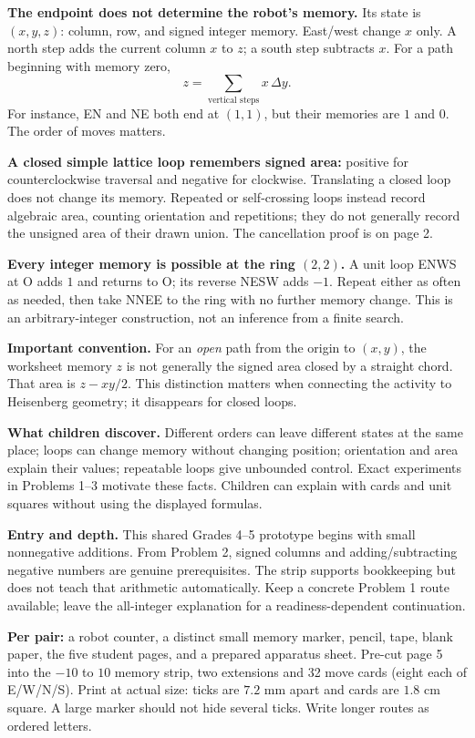 \documentclass[11pt,letterpaper]{article}
\newcommand{\sectiontitle}[1]{\par\vspace{4pt}{\large\bfseries #1}\par}
\begin{document}
\sectiontitle{The mathematics first}
\textbf{The endpoint does not determine the robot's memory.} Its state is $(x,y,z)$: column, row, and signed integer memory. East/west change $x$ only. A north step adds the current column $x$ to $z$; a south step subtracts $x$. For a path beginning with memory zero,
\[
 z=\sum_{\text{vertical steps}}x\,\Delta y.
\]
For instance, EN and NE both end at $(1,1)$, but their memories are $1$ and $0$. The order of moves matters.

\textbf{A closed simple lattice loop remembers signed area:} positive for counterclockwise traversal and negative for clockwise. Translating a closed loop does not change its memory. Repeated or self-crossing loops instead record algebraic area, counting orientation and repetitions; they do not generally record the unsigned area of their drawn union. The cancellation proof is on page 2.

\textbf{Every integer memory is possible at the ring $(2,2)$.} A unit loop ENWS at O adds $1$ and returns to O; its reverse NESW adds $-1$. Repeat either as often as needed, then take NNEE to the ring with no further memory change. This is an arbitrary-integer construction, not an inference from a finite search.

\textbf{Important convention.} For an \emph{open} path from the origin to $(x,y)$, the worksheet memory $z$ is not generally the signed area closed by a straight chord. That area is $z-xy/2$. This distinction matters when connecting the activity to Heisenberg geometry; it disappears for closed loops.

\textbf{What children discover.} Different orders can leave different states at the same place; loops can change memory without changing position; orientation and area explain their values; repeatable loops give unbounded control. Exact experiments in Problems 1--3 motivate these facts. Children can explain with cards and unit squares without using the displayed formulas.

\textbf{Entry and depth.} This shared Grades 4--5 prototype begins with small nonnegative additions. From Problem 2, signed columns and adding/subtracting negative numbers are genuine prerequisites. The strip supports bookkeeping but does not teach that arithmetic automatically. Keep a concrete Problem 1 route available; leave the all-integer explanation for a readiness-dependent continuation.

\sectiontitle{Prepare and launch}
\textbf{Per pair:} a robot counter, a distinct small memory marker, pencil, tape, blank paper, the five student pages, and a prepared apparatus sheet. Pre-cut page 5 into the $-10$ to $10$ memory strip, two extensions and 32 move cards (eight each of E/W/N/S). Print at actual size: ticks are $7.2$ mm apart and cards are $1.8$ cm square. A large marker should not hide several ticks. Write longer routes as ordered letters.
\end{document}
